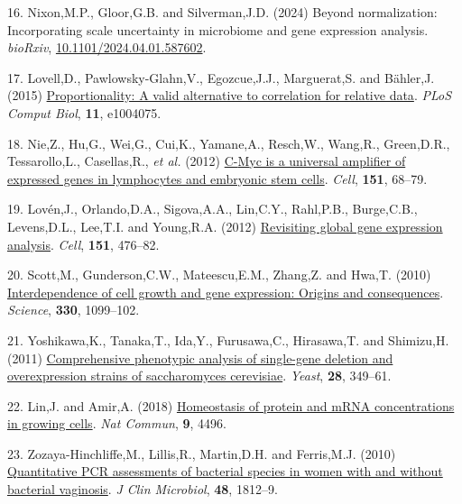 \documentclass[
]{article}
\newlength{\cslhangindent}
\newenvironment{CSLReferences}[2] %
 {\begin{list}{}{%
  \setlength{\itemindent}{0pt}
  \setlength{\leftmargin}{0pt}
  \setlength{\parsep}{0pt}
  \ifodd #1
   \setlength{\leftmargin}{\cslhangindent}
   \setlength{\itemindent}{-1\cslhangindent}
  \fi
  \setlength{\itemsep}{#2\baselineskip}}}
 {\end{list}}
\begin{document}
\begin{CSLReferences}{1}{1}
16. Nixon,M.P., Gloor,G.B. and Silverman,J.D. (2024) Beyond
normalization: Incorporating scale uncertainty in microbiome and gene
expression analysis. \emph{bioRxiv},
\href{https://doi.org/10.1101/2024.04.01.587602}{10.1101/2024.04.01.587602}.

17. Lovell,D., Pawlowsky-Glahn,V., Egozcue,J.J., Marguerat,S. and
Bähler,J. (2015)
\href{https://doi.org/10.1371/journal.pcbi.1004075}{Proportionality: A
valid alternative to correlation for relative data}. \emph{PLoS Comput
Biol}, \textbf{11}, e1004075.

18. Nie,Z., Hu,G., Wei,G., Cui,K., Yamane,A., Resch,W., Wang,R.,
Green,D.R., Tessarollo,L., Casellas,R., \emph{et al.} (2012)
\href{https://doi.org/10.1016/j.cell.2012.08.033}{C-{M}yc is a universal
amplifier of expressed genes in lymphocytes and embryonic stem cells}.
\emph{Cell}, \textbf{151}, 68--79.

19. Lovén,J., Orlando,D.A., Sigova,A.A., Lin,C.Y., Rahl,P.B.,
Burge,C.B., Levens,D.L., Lee,T.I. and Young,R.A. (2012)
\href{https://doi.org/10.1016/j.cell.2012.10.012}{Revisiting global gene
expression analysis}. \emph{Cell}, \textbf{151}, 476--82.

20. Scott,M., Gunderson,C.W., Mateescu,E.M., Zhang,Z. and Hwa,T. (2010)
\href{https://doi.org/10.1126/science.1192588}{Interdependence of cell
growth and gene expression: Origins and consequences}. \emph{Science},
\textbf{330}, 1099--102.

21. Yoshikawa,K., Tanaka,T., Ida,Y., Furusawa,C., Hirasawa,T. and
Shimizu,H. (2011) \href{https://doi.org/10.1002/yea.1843}{Comprehensive
phenotypic analysis of single-gene deletion and overexpression strains
of saccharomyces cerevisiae}. \emph{Yeast}, \textbf{28}, 349--61.

22. Lin,J. and Amir,A. (2018)
\href{https://doi.org/10.1038/s41467-018-06714-z}{Homeostasis of protein
and mRNA concentrations in growing cells}. \emph{Nat Commun},
\textbf{9}, 4496.

23. Zozaya-Hinchliffe,M., Lillis,R., Martin,D.H. and Ferris,M.J. (2010)
\href{https://doi.org/10.1128/JCM.00851-09}{Quantitative PCR assessments
of bacterial species in women with and without bacterial vaginosis}.
\emph{J Clin Microbiol}, \textbf{48}, 1812--9.


\end{CSLReferences}
\end{document}
